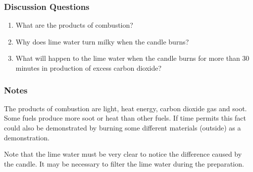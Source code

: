 \subsubsection*{Discussion Questions}
\begin{enumerate}
\item{What are the products of combustion?}
\item{Why does lime water turn milky when the candle burns?}
\item{What will happen to the lime water when the candle burns for more than 30 minutes in production of excess carbon dioxide?}
\end{enumerate}

\subsubsection*{Notes}
The products of combustion are light, heat energy, carbon dioxide gas and soot. Some fuels produce more soot or heat than other fuels. If time permits this fact could also be demonstrated by burning some different materials (outside) as a demonstration.

Note that the lime water must be very clear to notice the difference caused by the candle. It may be necessary to filter the lime water during the preparation.
